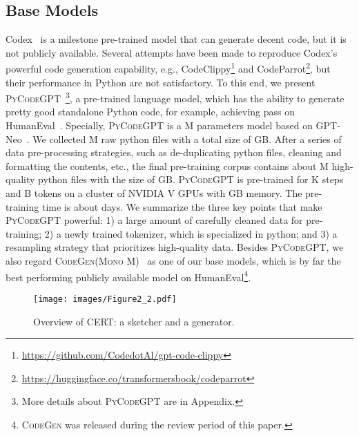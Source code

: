 \documentclass{article}
\newcommand{\cert}{\textsc{CERT}\xspace}
\newcommand{\codepy}{\textsc{PyCodeGPT}\xspace}
\newcommand{\codegen}{\textsc{CodeGen}\xspace}
\begin{document}
\subsection{Base Models} \label{basemodel}
Codex~\cite{chen2021evaluating} is a milestone pre-trained model that can generate decent code, but it is not publicly available. Several attempts have been made to reproduce Codex's powerful code generation capability, e.g.,  CodeClippy\footnote{\url{https://github.com/CodedotAl/gpt-code-clippy}} and CodeParrot\footnote{\url{https://huggingface.co/transformersbook/codeparrot}}, but their performance in Python are not satisfactory. To this end, we present \codepy~\footnote{More details about \codepy are in Appendix.}, a pre-trained language model, which has the ability to generate pretty good standalone Python code, for example, achieving  pass on HumanEval~\cite{chen2021evaluating}. 
Specially, \codepy is a M parameters model based on GPT-Neo~\cite{gpt-neo}. We collected M raw python files with a total size of GB. After a series of data pre-processing strategies, such as de-duplicating python files, cleaning and formatting the contents, etc., the final pre-training corpus contains about M high-quality python files with the size of GB. 
\codepy is pre-trained for K steps and B tokens on a cluster of  NVIDIA V GPUs with GB memory. The pre-training time is about  days.
We summarize the three key points that make \codepy powerful: 1) a large amount of carefully cleaned data for pre-training; 2) a newly trained tokenizer, which is specialized in python; and 3) a resampling strategy that prioritizes high-quality data.
Besides \codepy, we also regard \codegen (\textsc{Mono} M)~\cite{nijkamp2022conversational} as one of our base models, which is by far the best performing publicly available model on HumanEval\footnote{\codegen was released during the review period of this paper.}.

\begin{figure}[t]
    \small
    \centering
    \texttt{[image: images/Figure2\_2.pdf]}
\caption{Overview of \cert: a sketcher and a generator.}
    \label{fig:figure2}
\end{figure}
\end{document}
